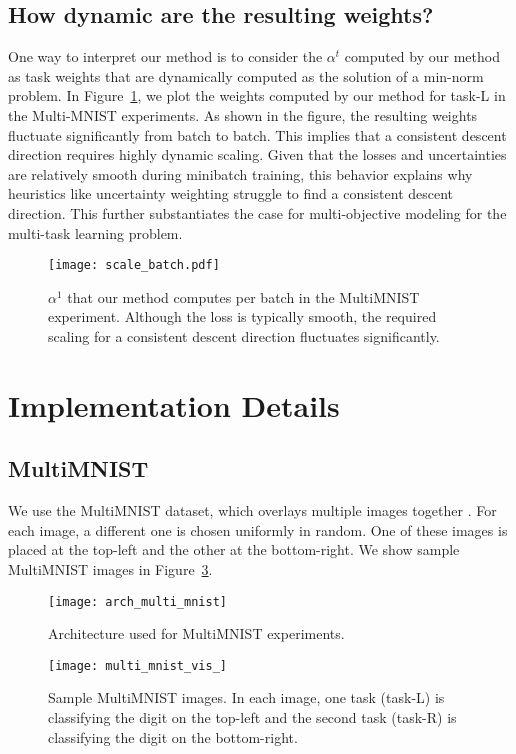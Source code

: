 \documentclass{article}
\begin{document}
\subsection{How dynamic are the resulting weights?}
\label{sec:additional_ablation}
One way to interpret our method is to consider the $\alpha^t$ computed by our method as task weights that are dynamically computed as the solution of a min-norm problem. In Figure~\ref{fig:mnist_scales}, we plot the weights computed by our method for task-L in the Multi-MNIST experiments. As shown in the figure, the resulting weights fluctuate significantly from batch to batch. This implies that a consistent descent direction requires highly dynamic scaling. Given that the losses and uncertainties are relatively smooth during minibatch training, this behavior explains why heuristics like uncertainty weighting \citep{Kendall2018} struggle to find a consistent descent direction. This further substantiates the case for multi-objective modeling for the multi-task learning problem.

\begin{figure}[H]\texttt{[image: scale\_batch.pdf]}
\caption{$\alpha^1$ that our method computes per batch in the MultiMNIST experiment. Although the loss is typically smooth, the required scaling for a consistent descent direction fluctuates significantly.}
\label{fig:mnist_scales}
\end{figure}
\fi \section{Implementation Details}


\subsection{MultiMNIST}
We use the MultiMNIST dataset, which overlays multiple images together \citep{multi_mnist}. For each image, a different one is chosen uniformly in random. One of these images is placed at the top-left and the other at the bottom-right. We show sample MultiMNIST images in Figure~\ref{fig:sample_multi_mnist}.

\begin{figure}[ht]
\texttt{[image: arch\_multi\_mnist]}
\caption{Architecture used for MultiMNIST experiments.}
\label{fig:multi_mnist}
\end{figure}

\begin{figure}[hb]
\texttt{[image: multi\_mnist\_vis\_]}
\caption{Sample MultiMNIST images. In each image, one task (task-L) is classifying the digit on the top-left and the second task (task-R) is classifying the digit on the bottom-right.}
\label{fig:sample_multi_mnist}
\end{figure}
\end{document}
